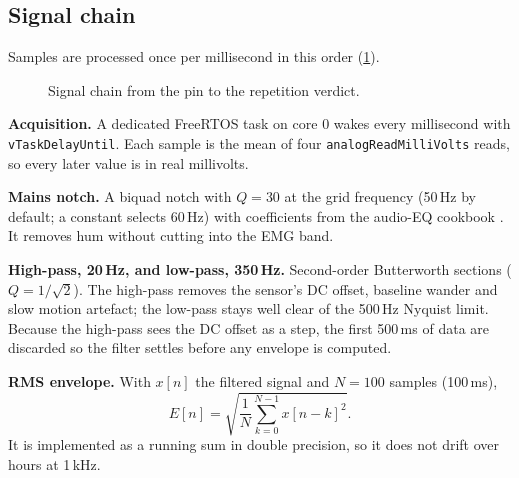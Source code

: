 \documentclass[11pt,letterpaper]{article}
\begin{document}
\subsection{Signal chain}
Samples are processed once per millisecond in this order (\cref{fig:chain}).
\begin{figure}[t]\centering
{}
\caption{Signal chain from the pin to the repetition verdict.}\label{fig:chain}
\end{figure}

\textbf{Acquisition.} A dedicated FreeRTOS task on core 0 wakes every millisecond with \texttt{vTaskDelayUntil}. Each sample is the mean of four \texttt{analogReadMilliVolts} reads, so every later value is in real millivolts.

\textbf{Mains notch.} A biquad notch with $Q=30$ at the grid frequency (50\,Hz by default; a constant selects 60\,Hz) with coefficients from the audio-EQ cookbook \citep{rbj}. It removes hum without cutting into the EMG band.

\textbf{High-pass, 20\,Hz, and low-pass, 350\,Hz.} Second-order Butterworth sections ($Q=1/\sqrt2$). The high-pass removes the sensor's DC offset, baseline wander and slow motion artefact; the low-pass stays well clear of the 500\,Hz Nyquist limit. Because the high-pass sees the DC offset as a step, the first 500\,ms of data are discarded so the filter settles before any envelope is computed.

\textbf{RMS envelope.} With $x[n]$ the filtered signal and $N=100$ samples (100\,ms),
\begin{equation}
E[n]=\sqrt{\frac{1}{N}\sum_{k=0}^{N-1}x[n-k]^2}.
\end{equation}
It is implemented as a running sum in double precision, so it does not drift over hours at 1\,kHz.
\end{document}
